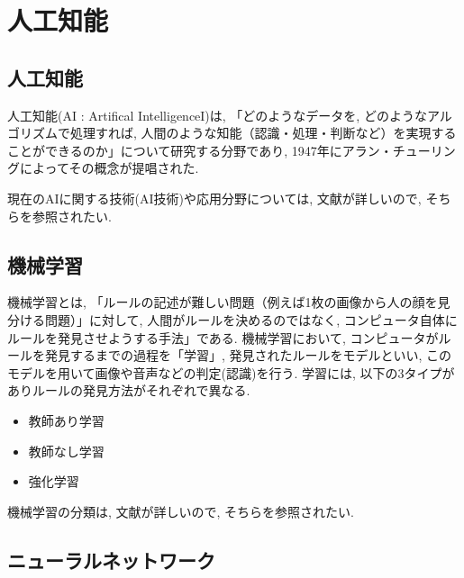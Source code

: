 \documentclass{suribt}
\begin{document}
\chapter{人工知能}

\section{人工知能}
人工知能(AI : Artifical IntelligenceI)は, 「どのようなデータを, どのようなアルゴリズムで処理すれば, 人間のような知能（認識・処理・判断など）を実現することができるのか」について研究する分野であり, 1947年にアラン・チューリングによってその概念が提唱された.

現在のAIに関する技術(AI技術)や応用分野については, 文献\cite{JSAI-2019}が詳しいので, そちらを参照されたい. 
\section{機械学習}
機械学習とは, 「ルールの記述が難しい問題（例えば1枚の画像から人の顔を見分ける問題）」に対して, 人間がルールを決めるのではなく, コンピュータ自体にルールを発見させようする手法」である. 機械学習において, コンピュータがルールを発見するまでの過程を「学習」, 発見されたルールをモデルといい,  このモデルを用いて画像や音声などの判定(認識)を行う. 
学習には, 以下の3タイプがありルールの発見方法がそれぞれで異なる.
\begin{itemize}
  \item 教師あり学習
  \item 教師なし学習
  \item 強化学習
\end{itemize}


機械学習の分類は, 文献\cite{Kamishima-2019}が詳しいので, そちらを参照されたい. 
\section{ニューラルネットワーク}
\end{document}
